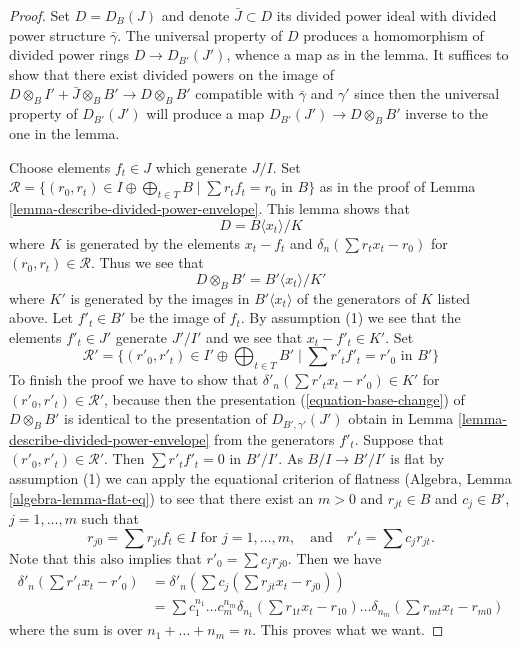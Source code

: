 \begin{proof}
Set $D = D_B(J)$ and denote $\bar J \subset D$ its divided power ideal
with divided power structure $\bar\gamma$. The universal property of
$D$ produces a homomorphism of divided power rings $D \to D_{B'}(J')$,
whence a map as in the lemma. It suffices to show that
there exist divided powers on the image of
$D \otimes_B I' + \bar J \otimes_B B' \to  D \otimes_B B'$
compatible with $\bar \gamma$ and $\gamma'$ since then
the universal property of $D_{B'}(J')$ will produce a map
$D_{B'}(J') \to D \otimes_B B'$ inverse to the one in the lemma.

\medskip\noindent
Choose elements $f_t \in J$ which generate $J/I$. Set
$\mathcal{R} = \{(r_0, r_t) \in I \oplus \bigoplus\nolimits_{t \in T} B
\mid \sum r_t f_t = r_0 \text{ in }B\}$ as in the proof of
Lemma \ref{lemma-describe-divided-power-envelope}. This lemma shows that
$$
D = B\langle x_t \rangle/ K
$$
where $K$ is generated by the elements $x_t - f_t$ and
$\delta_n(\sum r_t x_t - r_0)$ for $(r_0, r_t) \in \mathcal{R}$.
Thus we see that
\begin{equation}
\label{equation-base-change}
D \otimes_B B' = B'\langle x_t \rangle/K'
\end{equation}
where $K'$ is generated by the images in $B'\langle x_t \rangle$
of the generators of $K$ listed above. Let $f'_t \in B'$ be the image
of $f_t$. By assumption (1) we see that the elements $f'_t \in J'$
generate $J'/I'$ and we see that $x_t - f'_t \in K'$. Set
$$
\mathcal{R}' =
\{(r'_0, r'_t) \in I' \oplus \bigoplus\nolimits_{t \in T} B'
\mid \sum r'_t f'_t = r'_0 \text{ in }B'\}
$$
To finish the proof we have to show that
$\delta'_n(\sum r'_t x_t - r'_0) \in K'$ for
$(r'_0, r'_t) \in \mathcal{R}'$, because then the presentation
(\ref{equation-base-change}) of $D \otimes_B B'$ is identical
to the presentation of $D_{B', \gamma'}(J')$ obtain in
Lemma \ref{lemma-describe-divided-power-envelope} from the generators $f'_t$.
Suppose that $(r'_0, r'_t) \in \mathcal{R}'$. Then
$\sum r'_t f'_t = 0$ in $B'/I'$. As $B/I \to B'/I'$ is flat by
assumption (1) we can apply the equational criterion of flatness
(Algebra, Lemma \ref{algebra-lemma-flat-eq}) to see
that there exist an $m > 0$ and
$r_{jt} \in B$ and $c_j \in B'$, $j = 1, \ldots, m$ such
that
$$
r_{j0} = \sum r_{jt} f_t  \in I \text{ for } j = 1, \ldots, m,
\quad\text{and}\quad
r'_t = \sum c_j r_{jt}.
$$
Note that this also implies that $r'_0 = \sum c_j r_{j0}$.
Then we have
\begin{align*}
\delta'_n(\sum r'_t x_t  - r'_0)
& =
\delta'_n(\sum c_j (\sum r_{jt} x_t  - r_{j0})) \\
& =
\sum c_1^{n_1} \ldots c_m^{n_m}
\delta_{n_1}(\sum r_{1t} x_t  - r_{10}) \ldots
\delta_{n_m}(\sum r_{mt} x_t  - r_{m0})
\end{align*}
where the sum is over $n_1 + \ldots + n_m = n$. This proves what we want.
\end{proof}





